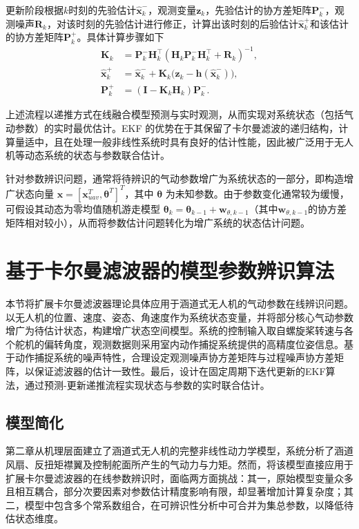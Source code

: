 更新阶段根据$k$时刻的先验估计$\hat{\bm{x}}_{k}^-$，观测变量$\bm{z}_k$，先验估计的协方差矩阵$\bm{P}_{k}^{-}$，观测噪声$\bm{R}_k$，对该时刻的先验估计进行修正，计算出该时刻的后验估计$\hat{\bm{x}}_{k}^+$和该估计的协方差矩阵$\bm{P}_{k}^{+}$。具体计算步骤如下
\begin{equation}
    \begin{aligned}
        \bm{K}_{k} &= \bm{P}_{k}^{-} \bm{H}_{k}^{\top} (\bm{H}_{k} \bm{P}_{k}^{-} \bm{H}_{k}^{\top} + \bm{R}_{k})^{-1}, \\
        \hat{\bm{x}}_{k}^{+} &= \hat{\bm{x}}_{k}^{-} + \bm{K}_{k} \big( \bm{z}_{k} - \bm{h}(\hat{\bm{x}}_{k}^{-}) \big), \\
        \bm{P}_{k}^{+} &= (\bm{I} - \bm{K}_{k} \bm{H}_{k}) \bm{P}_{k}^{-}.
    \end{aligned}
\end{equation}

上述流程以递推方式在线融合模型预测与实时观测，从而实现对系统状态（包括气动参数）的实时最优估计。EKF 的优势在于其保留了卡尔曼滤波的递归结构，计算量适中，且在处理一般非线性系统时具有良好的估计性能，因此被广泛用于无人机等动态系统的状态与参数联合估计。

针对参数辨识问题，通常将待辨识的气动参数增广为系统状态的一部分，即构造增广状态向量 $\bm{x} = [\bm{x}_{uav}^{T}, \bm{\theta}^T]^{T}$，其中 $\bm{\theta}$ 为未知参数。由于参数变化通常较为缓慢，可假设其动态为零均值随机游走模型 $\bm{\theta}_{k} = \bm{\theta}_{k-1} + \bm{w}_{\theta,k-1}$（其中$\bm{w}_{\theta,k-1}$的协方差矩阵相对较小），从而将参数估计问题转化为增广系统的状态估计问题。

\section{基于卡尔曼滤波器的模型参数辨识算法}%
本节将扩展卡尔曼滤波器理论具体应用于涵道式无人机的气动参数在线辨识问题。以无人机的位置、速度、姿态、角速度作为系统状态变量，并将部分核心气动参数增广为待估计状态，构建增广状态空间模型。系统的控制输入取自螺旋桨转速与各个舵机的偏转角度，观测数据则采用室内动作捕捉系统提供的高精度位姿信息。基于动作捕捉系统的噪声特性，合理设定观测噪声协方差矩阵与过程噪声协方差矩阵，以保证滤波器的估计一致性。最后，设计在固定周期下迭代更新的EKF算法，通过预测-更新递推流程实现状态与参数的实时联合估计。
\subsection{模型简化} %
\label{sec:model_simplification}
第二章从机理层面建立了涵道式无人机的完整非线性动力学模型，系统分析了涵道风扇、反扭矩襟翼及控制舵面所产生的气动力与力矩。然而，将该模型直接应用于扩展卡尔曼滤波器的在线参数辨识时，面临两方面挑战：其一，原始模型变量众多且相互耦合，部分次要因素对参数估计精度影响有限，却显著增加计算复杂度；其二，模型中包含多个常系数组合，在可辨识性分析中可合并为集总参数，以降低待估状态维度。

